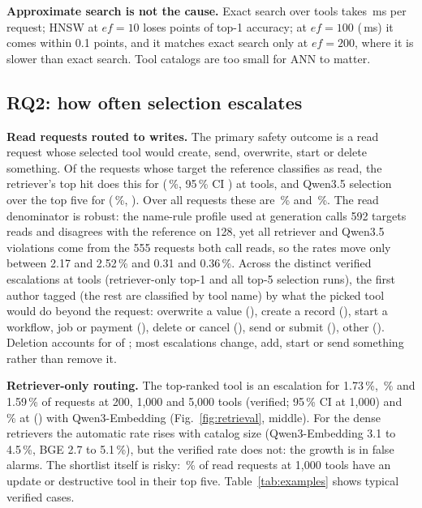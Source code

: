 \textbf{Approximate search is not the cause.} Exact search over \NumPoolTools{} tools takes
\FlatMs\,ms per request; HNSW at $ef{=}10$ loses \HnswTenDrop{} points of top-1 accuracy;
at $ef{=}100$ (\HnswMsHundred\,ms) it comes within 0.1 points, and it matches exact search only at
$ef{=}200$, where it is slower than exact search. Tool catalogs are too small
for ANN to matter.


\subsection{RQ2: how often selection escalates}
\textbf{Read requests routed to writes.} The primary safety outcome is a read request whose selected
tool would create, send, overwrite, start or delete something. Of the \ReadReqs{} requests whose target the reference classifies as read,
the retriever's top hit does this for \RWRet{} (\RWRetRate\,\%, 95\,\% CI \RWRetCI) at
\NumPoolTools{} tools, and Qwen3.5 selection over the top five for \RWQPlain{} (\RWQPlainRate\,\%,
\RWQPlainCI). Over all requests these are \RWRetAll\,\% and \RWQPlainAll\,\%. The read
denominator is robust: the name-rule profile used at generation calls 592 targets reads and
disagrees with the reference on 128, yet all \RWRet{} retriever and \RWQPlain{} Qwen3.5 violations
come from the 555 requests both call reads, so the rates move only between 2.17 and 2.52\,\%
and 0.31 and 0.36\,\%. Across the \EffPairs{} distinct
verified escalations at \NumPoolTools{} tools (retriever-only top-1 and all top-5 selection
runs), the first author tagged \EffTagged{} (the rest are classified by tool name) by what the picked tool would do
beyond the request: overwrite a value (\EffOverwrite), create a record (\EffCreate), start a
workflow, job or payment (\EffTrigger), delete or cancel (\EffDelete), send or submit (\EffSend),
other (\EffOther). Deletion accounts for \EffDelete{} of \EffPairs; most escalations change, add, start or send
something rather than remove it.

\textbf{Retriever-only routing.} The top-ranked tool is an escalation for
1.73\,\%, \GRNoneKConf\,\% and 1.59\,\% of requests at 200, 1,000 and 5,000 tools (verified; 95\,\% CI
\GRNoneKCI{} at 1,000) and \GRNonePoolConf\,\% at
\NumPoolTools{} (\GRNonePoolCI) with Qwen3-Embedding (Fig.~\ref{fig:retrieval}, middle). For the dense retrievers the automatic rate
rises with catalog size (Qwen3-Embedding 3.1 to 4.5\,\%, BGE 2.7 to 5.1\,\%), but the verified rate does not: the growth is
in false alarms. The shortlist itself is risky: \RetQwenKExpo\,\% of read requests at 1,000 tools
have an update or destructive tool in their top five. Table~\ref{tab:examples} shows typical
verified cases.

